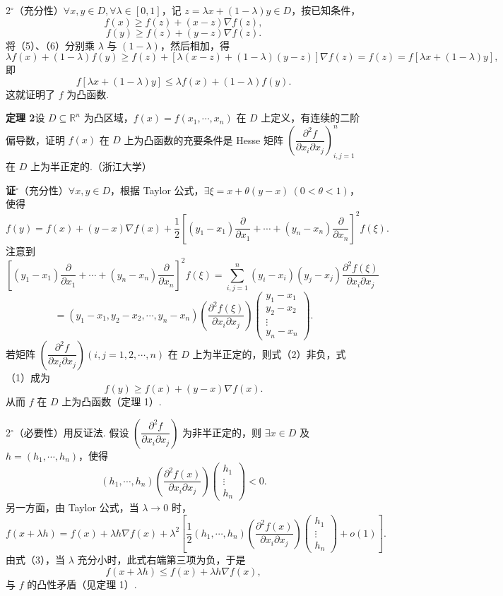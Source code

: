 \documentclass[UTF8, 12pt, fontset=fandol, oneside]{ctexart}
\begin{document}
2$^\circ$（充分性）$\forall x,y\in D,\forall\lambda\in[0,1]$，记 $z=\lambda x+(1-\lambda)y\in D$，按已知条件，
\[
  f(x)\ge f(z)+(x-z)\nabla f(z), \tag{5}
\]
\[
  f(y)\ge f(z)+(y-z)\nabla f(z). \tag{6}
\]
将（5）、（6）分别乘 $\lambda$ 与 $(1-\lambda)$，然后相加，得
\[
  \lambda f(x)+(1-\lambda)f(y)
  \ge f(z)+[\lambda(x-z)+(1-\lambda)(y-z)]\nabla f(z)
  =f(z)=f[\lambda x+(1-\lambda)y],
\]
即
\[
  f[\lambda x+(1-\lambda)y]\le\lambda f(x)+(1-\lambda)f(y).
\]
这就证明了 $f$ 为凸函数.

\noindent\textbf{定理 2}\quad 设 $D\subseteq\mathbb{R}^n$ 为凸区域，$f(x)=f(x_1,\cdots,x_n)$ 在 $D$ 上定义，有连续的二阶偏导数，证明 $f(x)$ 在 $D$ 上为凸函数的充要条件是 Hesse 矩阵 $\left(\dfrac{\partial^2 f}{\partial x_i\partial x_j}\right)_{i,j=1}^{n}$ 在 $D$ 上为半正定的.（浙江大学）

\noindent\textbf{证}$^\circ$（充分性）$\forall x,y\in D$，根据 Taylor 公式，$\exists\xi=x+\theta(y-x)\ (0<\theta<1)$，使得
\[
  f(y)=f(x)+(y-x)\nabla f(x)+\frac12
  \left[(y_1-x_1)\frac{\partial}{\partial x_1}+\cdots+
  (y_n-x_n)\frac{\partial}{\partial x_n}\right]^2 f(\xi). \tag{1}
\]
注意到
\[
  \left[(y_1-x_1)\frac{\partial}{\partial x_1}+\cdots+
  (y_n-x_n)\frac{\partial}{\partial x_n}\right]^2f(\xi)
  =\sum_{i,j=1}^{n}(y_i-x_i)(y_j-x_j)
  \frac{\partial^2f(\xi)}{\partial x_i\partial x_j}
\]
\[
  =(y_1-x_1,y_2-x_2,\cdots,y_n-x_n)
  \left(\frac{\partial^2f(\xi)}{\partial x_i\partial x_j}\right)
  \begin{pmatrix}
  y_1-x_1\\ y_2-x_2\\ \vdots\\ y_n-x_n
  \end{pmatrix}. \tag{2}
\]
若矩阵 $\left(\dfrac{\partial^2f}{\partial x_i\partial x_j}\right)(i,j=1,2,\cdots,n)$ 在 $D$ 上为半正定的，则式（2）非负，式（1）成为
\[
  f(y)\ge f(x)+(y-x)\nabla f(x).
\]
从而 $f$ 在 $D$ 上为凸函数（定理 1）.

2$^\circ$（必要性）用反证法. 假设 $\left(\dfrac{\partial^2f}{\partial x_i\partial x_j}\right)$ 为非半正定的，则 $\exists x\in D$ 及 $h=(h_1,\cdots,h_n)$，使得
\[
  (h_1,\cdots,h_n)
  \left(\frac{\partial^2f(x)}{\partial x_i\partial x_j}\right)
  \begin{pmatrix}h_1\\ \vdots\\ h_n\end{pmatrix}<0. \tag{3}
\]
另一方面，由 Taylor 公式，当 $\lambda\to0$ 时，
\[
  f(x+\lambda h)=f(x)+\lambda h\nabla f(x)
  +\lambda^2\left[
  \frac12(h_1,\cdots,h_n)
  \left(\frac{\partial^2f(x)}{\partial x_i\partial x_j}\right)
  \begin{pmatrix}h_1\\ \vdots\\ h_n\end{pmatrix}
  +o(1)\right].
\]
由式（3），当 $\lambda$ 充分小时，此式右端第三项为负，于是
\[
  f(x+\lambda h)\le f(x)+\lambda h\nabla f(x),
\]
与 $f$ 的凸性矛盾（见定理 1）.
\end{document}
